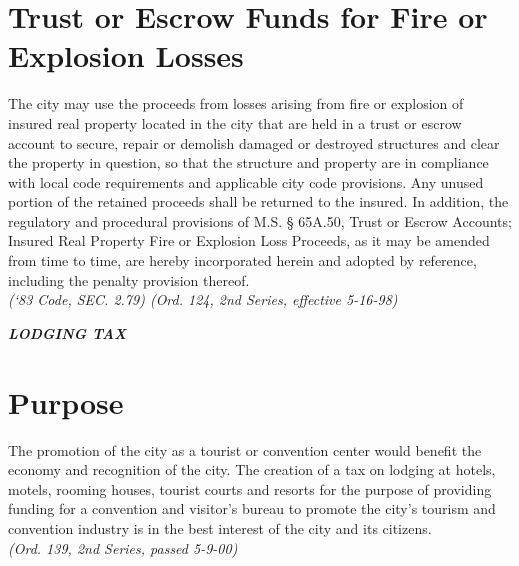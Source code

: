 \section{Trust or Escrow Funds for Fire or Explosion Losses}
The city may use the proceeds from losses arising from fire or explosion of insured real property located in the city that are held in a trust or escrow account to secure, repair or demolish damaged or destroyed structures and clear the property in question, so that the structure and property are in compliance with local code requirements and applicable city code provisions.  Any unused portion of the retained proceeds shall be returned to the insured.  In addition, the regulatory and procedural provisions of M.S. §  65A.50, Trust or Escrow Accounts; Insured Real Property Fire or Explosion Loss Proceeds, as it may be amended from time to time, are hereby incorporated herein and adopted by reference, including the penalty provision thereof.\\
\emph{(‘83 Code, SEC. 2.79)  (Ord. 124, 2nd Series, effective 5-16-98)}\\


\centerline{\textbf{\emph{\LARGE{LODGING TAX}}}}
\setcounter{section}{14}
\section{Purpose}
The promotion of the city as a tourist or convention center would benefit the economy and recognition of the city.  The creation of a tax on lodging at hotels, motels, rooming houses, tourist courts and resorts for the purpose of providing funding for a convention and visitor’s bureau to promote the city’s tourism and convention industry is in the best interest of the city and its citizens.\\
\emph{(Ord. 139, 2nd Series, passed 5-9-00)}
